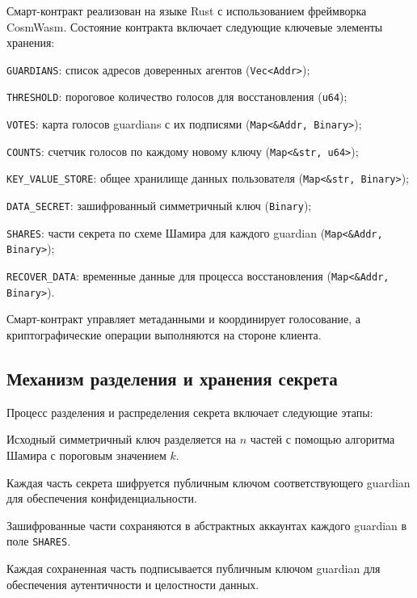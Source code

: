 \documentclass[12pt]{a&t}
\begin{document}
Смарт-контракт реализован на языке Rust с использованием фреймворка CosmWasm. Состояние контракта включает следующие ключевые элементы хранения:

\begin{itemlist}
\item
\texttt{GUARDIANS}: список адресов доверенных агентов (\texttt{Vec<Addr>});
\item
\texttt{THRESHOLD}: пороговое количество голосов для восстановления (\texttt{u64});
\item
\texttt{VOTES}: карта голосов guardians с их подписями (\texttt{Map<\&Addr, Binary>});
\item
\texttt{COUNTS}: счетчик голосов по каждому новому ключу (\texttt{Map<\&str, u64>});
\item
\texttt{KEY\_VALUE\_STORE}: общее хранилище данных пользователя (\texttt{Map<\&str, Binary>});
\item
\texttt{DATA\_SECRET}: зашифрованный симметричный ключ (\texttt{Binary});
\item
\texttt{SHARES}: части секрета по схеме Шамира для каждого guardian (\texttt{Map<\&Addr, Binary>});
\item
\texttt{RECOVER\_DATA}: временные данные для процесса восстановления (\texttt{Map<\&Addr, Binary>}).
\end{itemlist}

Смарт-контракт управляет метаданными и координирует голосование, а криптографические операции выполняются на стороне клиента.

\subsection{Механизм разделения и хранения секрета}

Процесс разделения и распределения секрета включает следующие этапы:

\begin{enumlist}[.]
\item
Исходный симметричный ключ разделяется на $n$ частей с помощью алгоритма Шамира с пороговым значением $k$.

\item
Каждая часть секрета шифруется публичным ключом соответствующего guardian для обеспечения конфиденциальности.

\item
Зашифрованные части сохраняются в абстрактных аккаунтах каждого guardian в поле \texttt{SHARES}.

\item
Каждая сохраненная часть подписывается публичным ключом guardian для обеспечения аутентичности и целостности данных.
\end{enumlist}
\end{document}
